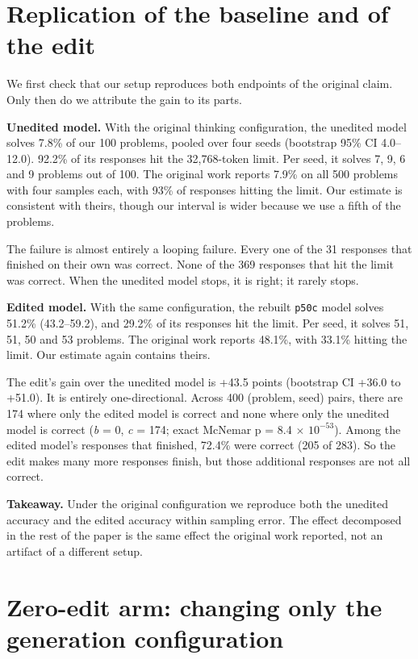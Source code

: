 \documentclass[11pt]{article}
\begin{document}
\section{Replication of the baseline and of the edit}\label{sec:4}

We first check that our setup reproduces both endpoints of the original claim. Only then do we attribute the gain to its parts.

\textbf{Unedited model.} With the original thinking configuration, the unedited model solves 7.8\% of our 100 problems, pooled over four seeds (bootstrap 95\% CI 4.0--12.0). 92.2\% of its responses hit the 32,768-token limit. Per seed, it solves 7, 9, 6 and 9 problems out of 100. The original work reports 7.9\% on all 500 problems with four samples each, with 93\% of responses hitting the limit. Our estimate is consistent with theirs, though our interval is wider because we use a fifth of the problems.

The failure is almost entirely a looping failure. Every one of the 31 responses that finished on their own was correct. None of the 369 responses that hit the limit was correct. When the unedited model stops, it is right; it rarely stops.

\textbf{Edited model.} With the same configuration, the rebuilt \texttt{p50c} model solves 51.2\% (43.2--59.2), and 29.2\% of its responses hit the limit. Per seed, it solves 51, 51, 50 and 53 problems. The original work reports 48.1\%, with 33.1\% hitting the limit. Our estimate again contains theirs.

The edit's gain over the unedited model is +43.5 points (bootstrap CI +36.0 to +51.0). It is entirely one-directional. Across 400 (problem, seed) pairs, there are 174 where only the edited model is correct and none where only the unedited model is correct (\emph{b} = 0, \emph{c} = 174; exact McNemar p = 8.4 $\times$ $10^{-53}$). Among the edited model's responses that finished, 72.4\% were correct (205 of 283). So the edit makes many more responses finish, but those additional responses are not all correct.

\textbf{Takeaway.} Under the original configuration we reproduce both the unedited accuracy and the edited accuracy within sampling error. The effect decomposed in the rest of the paper is the same effect the original work reported, not an artifact of a different setup.

\section{Zero-edit arm: changing only the generation configuration}\label{sec:5}
\end{document}
